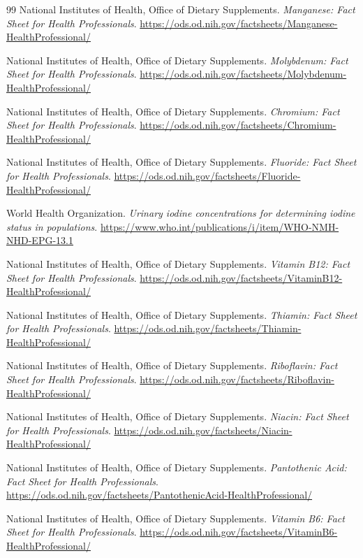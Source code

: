 \begin{thebibliography}{99}
 National Institutes of Health, Office of Dietary Supplements. \emph{Manganese: Fact Sheet for Health Professionals}. \url{https://ods.od.nih.gov/factsheets/Manganese-HealthProfessional/}

 National Institutes of Health, Office of Dietary Supplements. \emph{Molybdenum: Fact Sheet for Health Professionals}. \url{https://ods.od.nih.gov/factsheets/Molybdenum-HealthProfessional/}

 National Institutes of Health, Office of Dietary Supplements. \emph{Chromium: Fact Sheet for Health Professionals}. \url{https://ods.od.nih.gov/factsheets/Chromium-HealthProfessional/}

 National Institutes of Health, Office of Dietary Supplements. \emph{Fluoride: Fact Sheet for Health Professionals}. \url{https://ods.od.nih.gov/factsheets/Fluoride-HealthProfessional/}

 World Health Organization. \emph{Urinary iodine concentrations for determining iodine status in populations}. \url{https://www.who.int/publications/i/item/WHO-NMH-NHD-EPG-13.1}

 National Institutes of Health, Office of Dietary Supplements. \emph{Vitamin B12: Fact Sheet for Health Professionals}. \url{https://ods.od.nih.gov/factsheets/VitaminB12-HealthProfessional/}

 National Institutes of Health, Office of Dietary Supplements. \emph{Thiamin: Fact Sheet for Health Professionals}. \url{https://ods.od.nih.gov/factsheets/Thiamin-HealthProfessional/}

 National Institutes of Health, Office of Dietary Supplements. \emph{Riboflavin: Fact Sheet for Health Professionals}. \url{https://ods.od.nih.gov/factsheets/Riboflavin-HealthProfessional/}

 National Institutes of Health, Office of Dietary Supplements. \emph{Niacin: Fact Sheet for Health Professionals}. \url{https://ods.od.nih.gov/factsheets/Niacin-HealthProfessional/}

 National Institutes of Health, Office of Dietary Supplements. \emph{Pantothenic Acid: Fact Sheet for Health Professionals}. \url{https://ods.od.nih.gov/factsheets/PantothenicAcid-HealthProfessional/}

 National Institutes of Health, Office of Dietary Supplements. \emph{Vitamin B6: Fact Sheet for Health Professionals}. \url{https://ods.od.nih.gov/factsheets/VitaminB6-HealthProfessional/}


\end{thebibliography}
